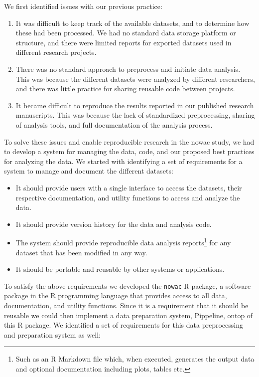 We first identified issues with our previous practice: 
\begin{enumerate} 
    \item It was difficult to keep track of the available datasets, and to
        determine how these had been processed. We had no standard data storage
        platform or structure, and there were limited reports for exported
        datasets used in different research projects.
        
    \item There was no standard approach to preprocess and initiate data
        analysis. This was because the different datasets were analyzed by
        different researchers, and there was little practice for sharing
        reusable code between projects. 

    \item It became difficult to reproduce the results reported in our published
        research manuscripts. This was because the lack of standardized
        preprocessing, sharing of analysis tools, and full documentation of the
        analysis process. 
        
\end{enumerate} 

To solve these issues and enable reproducible research in the \gls{nowac} study,
we had to develop a system for managing the data, code, and our proposed best
practices for analyzing the data. We started with identifying a set of
requirements for a system to manage and document the different datasets: 

\begin{itemize} 
    \item It should provide users with a single interface to access the
        datasets, their respective documentation, and utility functions to
        access and analyze the data.
    \item It should provide version history for the data and analysis code. 
    \item The system should provide reproducible data analysis
        reports\footnote{Such as an R Markdown file which, when executed,
        generates the output data and optional documentation including plots,
        tables etc.} for any dataset that has been modified in any way. 
    \item It should be portable and reusable by other systems or applications. 
\end{itemize} 

To satisfy the above requirements we developed the \texttt{nowac} R package, a
software package in the R programming language that provides access to all data,
documentation, and utility functions. Since it is a requirement that it should
be reusable we could then implement a data preparation system, Pippeline, ontop
of this R package. We identified a set of requirements for this data
preprocessing and preparation system as well: 

